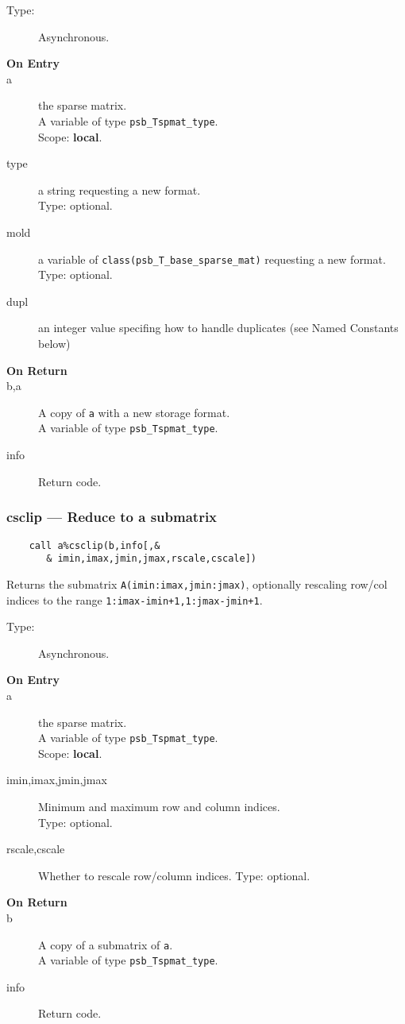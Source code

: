 \begin{description}
\item[Type:] Asynchronous.
\item[\bf On Entry]
\item[a] the sparse matrix.\\
A variable of type \verb|psb_Tspmat_type|.\\
Scope: {\bf local}.\\
\item[type] a string requesting a new format.\\
Type: optional.
\item[mold] a variable of \verb|class(psb_T_base_sparse_mat)|  requesting a new format.\\
Type: optional.
\item[dupl] an integer value specifing how to handle duplicates (see
  Named Constants below)
\end{description}

\begin{description}
\item[\bf On Return]
\item[b,a] A copy  of \verb|a| with a new storage format.\\
A variable of type \verb|psb_Tspmat_type|.
\item[info] Return code. 
\end{description}


\subsubsection*{csclip --- Reduce to a submatrix}
\begin{verbatim}
    call a%csclip(b,info[,&
       & imin,imax,jmin,jmax,rscale,cscale])
\end{verbatim}

Returns the submatrix \verb|A(imin:imax,jmin:jmax)|, optionally
rescaling row/col indices to the range
\verb|1:imax-imin+1,1:jmax-jmin+1|.  
\begin{description}
\item[Type:] Asynchronous.
\item[\bf On Entry]
\item[a] the sparse matrix.\\
A variable of type \verb|psb_Tspmat_type|.\\
Scope: {\bf local}.\\
\item[imin,imax,jmin,jmax] Minimum and maximum row and column indices.\\
Type: optional.
\item[rscale,cscale] Whether to rescale row/column indices.
Type: optional.
\end{description}
\begin{description}
\item[\bf On Return]
\item[b] A copy  of a submatrix of \verb|a|.\\
A variable of type \verb|psb_Tspmat_type|.
\item[info] Return code. 
\end{description}


